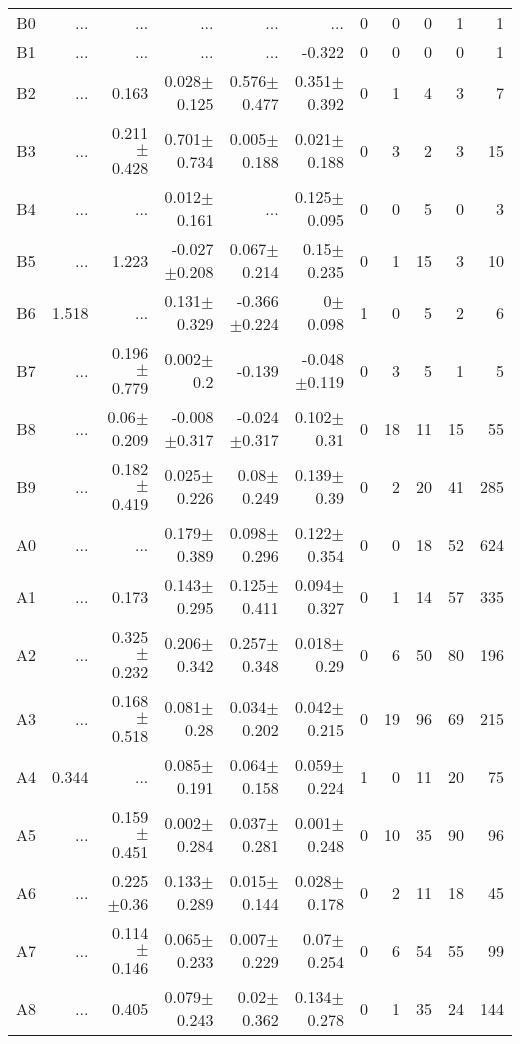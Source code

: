 \begin{table}[t]
\begin{table}[t]
\begin{center}
\begin{tabular}{c|rrrrr|rrrrr}
    B0	&	 ...	&	 ...	&	 ...	&	 ...	&	 ...	&	0	&	0	&	0	&	1	&	1	\\
    B1	&	 ...	&	 ...	&	 ...	&	 ...	&	-0.322	&	0	&	0	&	0	&	0	&	1	\\
    B2	&	 ...	&	0.163	&	0.028$\pm$0.125	&	0.576$\pm$0.477	&	0.351$\pm$0.392	&	0	&	1	&	4	&	3	&	7	\\
    B3	&	 ...	&	0.211$\pm$0.428	&	0.701$\pm$0.734	&	0.005$\pm$0.188	&	0.021$\pm$0.188	&	0	&	3	&	2	&	3	&	15	\\
    B4	&	 ...	&	 ...	&	0.012$\pm$0.161	&	 ...	&	0.125$\pm$0.095	&	0	&	0	&	5	&	0	&	3	\\
    B5	&	 ...	&	1.223	&	-0.027$\pm$0.208	&	0.067$\pm$0.214	&	0.15$\pm$0.235	&	0	&	1	&	15	&	3	&	10	\\
    B6	&	1.518	&	 ...	&	0.131$\pm$0.329	&	-0.366$\pm$0.224	&	0$\pm$0.098	&	1	&	0	&	5	&	2	&	6	\\
    B7	&	 ...	&	0.196$\pm$0.779	&	0.002$\pm$0.2	&	-0.139	&	-0.048$\pm$0.119	&	0	&	3	&	5	&	1	&	5	\\
    B8	&	 ...	&	0.06$\pm$0.209	&	-0.008$\pm$0.317	&	-0.024$\pm$0.317	&	0.102$\pm$0.31	&	0	&	18	&	11	&	15	&	55	\\
    B9	&	 ...	&	0.182$\pm$0.419	&	0.025$\pm$0.226	&	0.08$\pm$0.249	&	0.139$\pm$0.39	&	0	&	2	&	20	&	41	&	285	\\
    A0	&	 ...	&	 ...	&	0.179$\pm$0.389	&	0.098$\pm$0.296	&	0.122$\pm$0.354	&	0	&	0	&	18	&	52	&	624	\\
    A1	&	 ...	&	0.173	&	0.143$\pm$0.295	&	0.125$\pm$0.411	&	0.094$\pm$0.327	&	0	&	1	&	14	&	57	&	335	\\
    A2	&	 ...	&	0.325$\pm$0.232	&	0.206$\pm$0.342	&	0.257$\pm$0.348	&	0.018$\pm$0.29	&	0	&	6	&	50	&	80	&	196	\\
    A3	&	 ...	&	0.168$\pm$0.518	&	0.081$\pm$0.28	&	0.034$\pm$0.202	&	0.042$\pm$0.215	&	0	&	19	&	96	&	69	&	215	\\
    A4	&	0.344	&	 ...	&	0.085$\pm$0.191	&	0.064$\pm$0.158	&	0.059$\pm$0.224	&	1	&	0	&	11	&	20	&	75	\\
    A5	&	 ...	&	0.159$\pm$0.451	&	0.002$\pm$0.284	&	0.037$\pm$0.281	&	0.001$\pm$0.248	&	0	&	10	&	35	&	90	&	96	\\
    A6	&	 ...	&	0.225$\pm$0.36	&	0.133$\pm$0.289	&	0.015$\pm$0.144	&	0.028$\pm$0.178	&	0	&	2	&	11	&	18	&	45	\\
    A7	&	 ...	&	0.114$\pm$0.146	&	0.065$\pm$0.233	&	0.007$\pm$0.229	&	0.07$\pm$0.254	&	0	&	6	&	54	&	55	&	99	\\
    A8	&	 ...	&	0.405	&	0.079$\pm$0.243	&	0.02$\pm$0.362	&	0.134$\pm$0.278	&	0	&	1	&	35	&	24	&	144	\\

\end{tabular}
\end{center}
\end{table}
\end{table}
